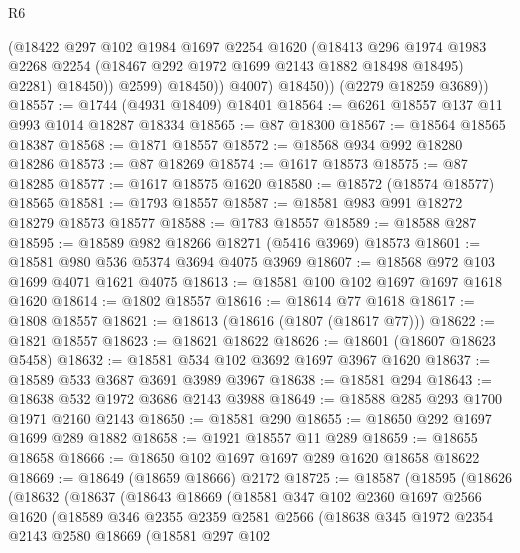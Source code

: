 \begin{lexlean}{R6}
\begin{coremodule}
                    (@18422
                      @297
                      @102
                      @1984
                      @1697
                      @2254
                      @1620
                      (@18413
                        @296
                        @1974
                        @1983
                        @2268
                        @2254
                        (@18467 @292 @1972 @1699 @2143 @1882 @18498 @18495)
                        @2281)
                      @18450))
                  @2599)
                @18450))
            @4007)
          @18450))
      (@2279 @18259 @3689))
@18557 := @1744 (@4931 @18409) @18401
@18564 := @6261 @18557 @137 @11 @993 @1014 @18287 @18334
@18565 := @87 @18300
@18567 := @18564 @18565 @18387
@18568 := @1871 @18557
@18572 := @18568 @934 @992 @18280 @18286
@18573 := @87 @18269
@18574 := @1617 @18573
@18575 := @87 @18285
@18577 := @1617 @18575 @1620
@18580 := @18572 (@18574 @18577) @18565
@18581 := @1793 @18557
@18587 := @18581 @983 @991 @18272 @18279 @18573 @18577
@18588 := @1783 @18557
@18589 := @18588 @287
@18595 := @18589 @982 @18266 @18271 (@5416 @3969) @18573
@18601 := @18581 @980 @536 @5374 @3694 @4075 @3969
@18607 := @18568 @972 @103 @1699 @4071 @1621 @4075
@18613 := @18581 @100 @102 @1697 @1697 @1618 @1620
@18614 := @1802 @18557
@18616 := @18614 @77 @1618
@18617 := @1808 @18557
@18621 := @18613 (@18616 (@1807 (@18617 @77)))
@18622 := @1821 @18557
@18623 := @18621 @18622
@18626 := @18601 (@18607 @18623 @5458)
@18632 := @18581 @534 @102 @3692 @1697 @3967 @1620
@18637 := @18589 @533 @3687 @3691 @3989 @3967
@18638 := @18581 @294
@18643 := @18638 @532 @1972 @3686 @2143 @3988
@18649 := @18588 @285 @293 @1700 @1971 @2160 @2143
@18650 := @18581 @290
@18655 := @18650 @292 @1697 @1699 @289 @1882
@18658 := @1921 @18557 @11 @289
@18659 := @18655 @18658
@18666 := @18650 @102 @1697 @1697 @289 @1620 @18658 @18622
@18669 := @18649 (@18659 @18666) @2172
@18725 := @18587
    (@18595
      (@18626
        (@18632
          (@18637
            (@18643
              @18669
              (@18581
                @347
                @102
                @2360
                @1697
                @2566
                @1620
                (@18589
                  @346
                  @2355
                  @2359
                  @2581
                  @2566
                  (@18638
                    @345
                    @1972
                    @2354
                    @2143
                    @2580
                    @18669
                    (@18581
                      @297
                      @102

\end{coremodule}
\end{lexlean}
